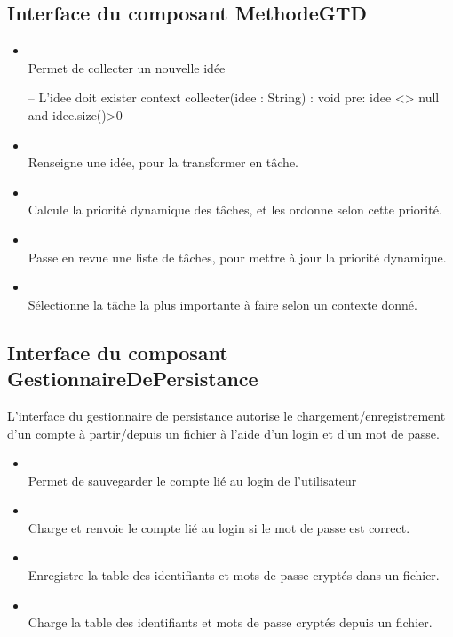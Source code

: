 	\subsection{Interface du composant MethodeGTD}

		\begin{itemize}
			\item {} \\
			Permet de collecter un nouvelle idée
			\begin{ocl}
-- L'idee doit exister
context collecter(idee : String) : void
pre: idee <> null
	and idee.size()>0
			\end{ocl}

			\item {} \\
			Renseigne une idée, pour la transformer en tâche.

			\item {} \\
			Calcule la priorité dynamique des tâches, et les ordonne selon cette priorité.

			\item {} \\
			Passe en revue une liste de tâches, pour mettre à jour la priorité dynamique.

			\item {} \\
			Sélectionne la tâche la plus importante à faire selon un contexte donné.
		\end{itemize}

	\subsection{Interface du composant GestionnaireDePersistance}

	L'interface du gestionnaire de persistance autorise le chargement/enregistrement d'un compte à partir/depuis un fichier à l'aide d'un login et d'un mot de passe.

		\begin{itemize}
			\item {} \\
			Permet de sauvegarder le compte lié au login de l'utilisateur
			\item {} \\
			Charge et renvoie le compte lié au login si le mot de passe est correct.
			\item {} \\
			Enregistre la table des identifiants et mots de passe cryptés dans un fichier.
			\item {} \\
			Charge la table des identifiants et mots de passe cryptés depuis un fichier.
		\end{itemize}

